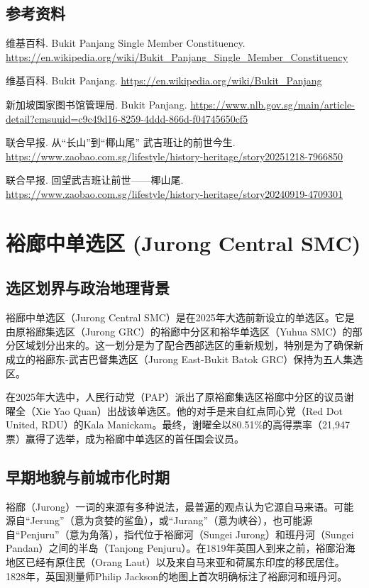 \documentclass[11pt,a4paper,twoside,openany]{book}
\begin{document}
\section*{参考资料}
\begin{enumerate}[label={[\arabic*]},leftmargin=*,topsep=2pt,itemsep=1pt,parsep=0pt]
  \item 维基百科. Bukit Panjang Single Member Constituency. \url{https://en.wikipedia.org/wiki/Bukit_Panjang_Single_Member_Constituency}
  \item 维基百科. Bukit Panjang. \url{https://en.wikipedia.org/wiki/Bukit_Panjang}
  \item 新加坡国家图书馆管理局. Bukit Panjang. \url{https://www.nlb.gov.sg/main/article-detail?cmsuuid=c9c49d16-8259-4ddd-866d-f04745650cf5}
  \item 联合早报. 从“长山”到“椰山尾” 武吉班让的前世今生. \url{https://www.zaobao.com.sg/lifestyle/history-heritage/story20251218-7966850}
  \item 联合早报. 回望武吉班让前世——椰山尾. \url{https://www.zaobao.com.sg/lifestyle/history-heritage/story20240919-4709301}
\end{enumerate}

\chapter{裕廊中单选区 (Jurong Central SMC)}

\section{选区划界与政治地理背景}
裕廊中单选区（Jurong Central SMC）是在2025年大选前新设立的单选区。它是由原裕廊集选区（Jurong GRC）的裕廊中分区和裕华单选区（Yuhua SMC）的部分区域划分出来的。这一划分是为了配合西部选区的重新规划，特别是为了确保新成立的裕廊东-武吉巴督集选区（Jurong East-Bukit Batok GRC）保持为五人集选区。

在2025年大选中，人民行动党（PAP）派出了原裕廊集选区裕廊中分区的议员谢曜全（Xie Yao Quan）出战该单选区。他的对手是来自红点同心党（Red Dot United, RDU）的Kala Manickam。最终，谢曜全以80.51\%的高得票率（21,947票）赢得了选举，成为裕廊中单选区的首任国会议员。

\section{早期地貌与前城市化时期}
裕廊（Jurong）一词的来源有多种说法，最普遍的观点认为它源自马来语。可能源自“Jerung”（意为贪婪的鲨鱼），或“Jurang”（意为峡谷），也可能源自“Penjuru”（意为角落），指代位于裕廊河（Sungei Jurong）和班丹河（Sungei Pandan）之间的半岛（Tanjong Penjuru）。在1819年英国人到来之前，裕廊沿海地区已经有原住民（Orang Laut）以及来自马来亚和荷属东印度的移民居住。1828年，英国测量师Philip Jackson的地图上首次明确标注了裕廊河和班丹河。
\end{document}
